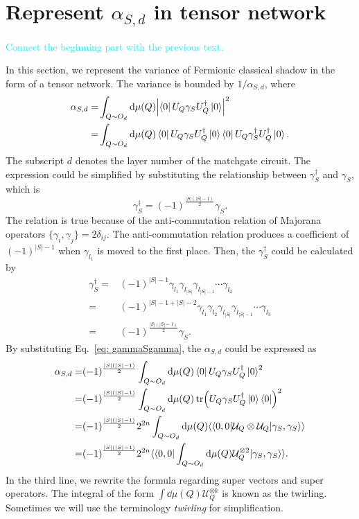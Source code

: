 \documentclass{article}
\newcommand{\supket}[1]{|#1 \rangle\rangle}
\newcommand{\supbra}[1]{\langle\langle #1 |}
\begin{document}
\section{Represent $\alpha_{S,d}$ in tensor network}
\label{sec: Represent alpha in tensor network}
\textcolor{cyan}{Connect the beginning part with the previous text.}

In this section, we represent the variance of Fermionic classical shadow in the form of a tensor network.
The variance is bounded by $1/\alpha_{S,d}$, where
\begin{align}
    \alpha_{S,d} =& \int_{Q\sim O_d } \dd \mu(Q) \abs{\bra{0} U_Q \gamma_S U_Q^\dagger \ket{0}}^2 \\
    =& \int_{Q\sim O_d } \dd \mu(Q) \bra{0} U_Q \gamma_S U_Q^\dagger \ket{0}\bra{0} U_Q \gamma_S^\dagger U_Q^\dagger \ket{0}.
\end{align}
The subscript $d$ denotes the layer number of the matchgate circuit. 
The expression could be simplified by substituting the relationship between $\gamma_S^\dagger$ and $\gamma_S$, which is 
\begin{equation}
    \gamma_S^\dagger = (-1)^{\frac{|S|(|S|-1)}{2}}\gamma_S.
\end{equation}
The relation is true because of the anti-commutation relation of Majorana operators $\{\gamma_i, \gamma_j\} = 2\delta_{ij}$. The anti-commutation relation produces a coefficient of $(-1)^{|S|-1}$ when $\gamma_{l_1}$ is moved to the first place. 
Then, the $\gamma_S^\dagger$ could be calculated by
\begin{align}
    \gamma_S^\dagger=& (-1)^{|S|-1}\gamma_{l_1}\gamma_{l_{|S|}}\gamma_{l_{|S|-1}}\cdots \gamma_{l_2}\\
    =& (-1)^{|S|-1 + |S|-2} \gamma_{l_1}\gamma_{l_2}\gamma_{l_{|S|}}\gamma_{l_{|S|-1}}\cdots \gamma_{l_3}\\
    \label{eq: gammaSgamma}
    =& (-1)^{\frac{|S|(|S|-1)}{2}}\gamma_S.
\end{align}
By substituting Eq.~\eqref{eq: gammaSgamma}, the $\alpha_{S, d}$ could be expressed as  
\begin{align}
    \alpha_{S,d} =& (-1)^{\frac{|S|(|S|-1)}{2}} \int_{Q \sim O_d} \dd\mu(Q) 
    \bra{0}U_Q \gamma_SU_Q^\dagger\ket{0}^2\\
    =& (-1)^{\frac{|S|(|S|-1)}{2}} \int_{Q \sim O_d} \dd\mu(Q) 
    \tr(U_Q \gamma_SU_Q^\dagger\ket{0} \bra{0} )^2\\
    =& (-1)^{\frac{|S|(|S|-1)}{2}} 2^{2n} \int_{Q \sim O_d} \dd\mu(Q) 
    \supbra{0,0} \mathcal{U}_Q\otimes\mathcal{U}_Q \supket{\gamma_S,\gamma_S} \\
    =& (-1)^{\frac{|S|(|S|-1)}{2}} 2^{2n}  \supbra{0,0}  \int_{Q \sim O_d}\dd\mu(Q) \mathcal{U}_Q^{\otimes 2} \supket{\gamma_S,\gamma_S}.
\end{align}
In the third line, we rewrite the formula regarding super vectors and super operators. The integral of the form $\int \dd \mu(Q) \mathcal{U}_Q^{\otimes k}$ is known as the twirling. Sometimes we will use the terminology \textit{twirling} for simplification.
\end{document}
